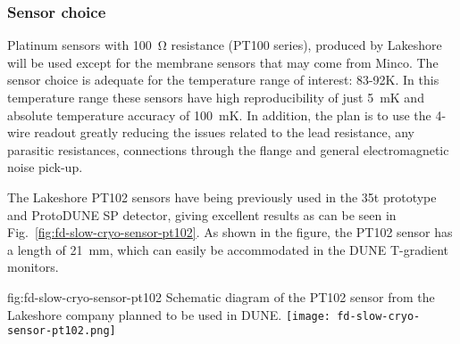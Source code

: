 \subsubsection{Sensor choice}


Platinum sensors with \SI{100}{\ohm} resistance (PT100 series), produced by Lakeshore will be used except for the membrane sensors that may come from Minco. The sensor choice is adequate for the temperature range of interest: 83-92\si{K}. In this temperature range these sensors have high reproducibility of just \SI{5}{mK} and absolute temperature accuracy of \SI{100}{mK}. In addition, the plan is to use the 4-wire readout greatly reducing the issues related to the lead resistance, any parasitic resistances, connections through the flange and general electromagnetic noise pick-up.

The Lakeshore PT102 sensors have being previously used in the 35t prototype and ProtoDUNE SP detector, giving excellent results as can be seen in Fig.~\ref{fig:fd-slow-cryo-sensor-pt102}.  As shown in the figure, the PT102 sensor has a length of \SI{21}{mm}, which can easily be accommodated in the DUNE T-gradient monitors. 

\begin{dunefigure}[diag PT102]{fig:fd-slow-cryo-sensor-pt102}
  {Schematic diagram of the PT102 sensor from the Lakeshore company planned to be used in DUNE.}
  \texttt{[image: fd-slow-cryo-sensor-pt102.png]}
\end{dunefigure}

